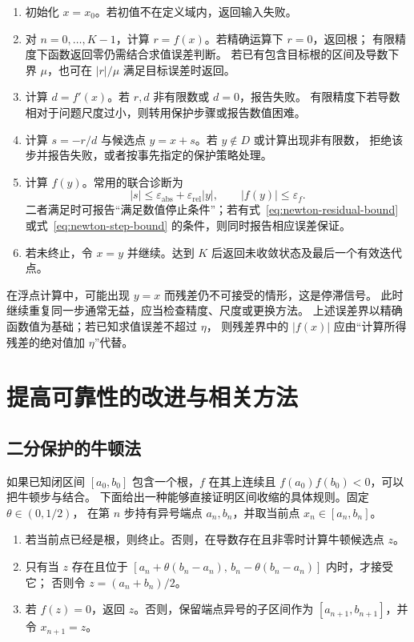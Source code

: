 \documentclass{ctexart}
\begin{document}
\begin{enumerate}
  \item 初始化 $x=x_0$。若初值不在定义域内，返回输入失败。
  \item 对 $n=0,\ldots,K-1$，计算 $r=f(x)$。若精确运算下 $r=0$，返回根；
        有限精度下函数返回零仍需结合求值误差判断。
        若已有包含目标根的区间及导数下界 $\mu$，也可在 $|r|/\mu$ 满足目标误差时返回。
  \item 计算 $d=f'(x)$。若 $r,d$ 非有限数或 $d=0$，报告失败。
        有限精度下若导数相对于问题尺度过小，则转用保护步骤或报告数值困难。
  \item 计算 $s=-r/d$ 与候选点 $y=x+s$。若 $y\notin D$ 或计算出现非有限数，
        拒绝该步并报告失败，或者按事先指定的保护策略处理。
  \item 计算 $f(y)$。常用的联合诊断为
        \[
          |s|\le\varepsilon_{\mathrm{abs}}+\varepsilon_{\mathrm{rel}}|y|,
          \qquad |f(y)|\le\varepsilon_f.
        \]
        二者满足时可报告“满足数值停止条件”；若有式~\eqref{eq:newton-residual-bound}
        或式~\eqref{eq:newton-step-bound} 的条件，则同时报告相应误差保证。
  \item 若未终止，令 $x=y$ 并继续。达到 $K$ 后返回未收敛状态及最后一个有效迭代点。
\end{enumerate}

在浮点计算中，可能出现 $y=x$ 而残差仍不可接受的情形，这是停滞信号。
此时继续重复同一步通常无益，应当检查精度、尺度或更换方法。
上述误差界以精确函数值为基础；若已知求值误差不超过 $\eta$，
则残差界中的 $|f(x)|$ 应由“计算所得残差的绝对值加 $\eta$”代替。

\section{提高可靠性的改进与相关方法}
\label{sec:newton-variants}

\subsection{二分保护的牛顿法}

如果已知闭区间 $[a_0,b_0]$ 包含一个根，$f$ 在其上连续且
$f(a_0)f(b_0)<0$，可以把牛顿步与结合。
下面给出一种能够直接证明区间收缩的具体规则。固定 $\theta\in(0,1/2)$，
在第 $n$ 步持有异号端点 $a_n,b_n$，并取当前点 $x_n\in[a_n,b_n]$。

\begin{enumerate}
  \item 若当前点已经是根，则终止。否则，在导数存在且非零时计算牛顿候选点 $z$。
  \item 只有当 $z$ 存在且位于
        $[a_n+\theta(b_n-a_n),\,b_n-\theta(b_n-a_n)]$ 内时，才接受它；
        否则令 $z=(a_n+b_n)/2$。
  \item 若 $f(z)=0$，返回 $z$。否则，保留端点异号的子区间作为
        $[a_{n+1},b_{n+1}]$，并令 $x_{n+1}=z$。
\end{enumerate}
\end{document}
